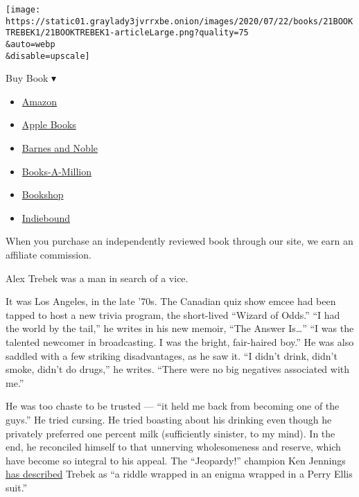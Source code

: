 \texttt{[image: https://static01.graylady3jvrrxbe.onion/images/2020/07/22/books/21BOOKTREBEK1/21BOOKTREBEK1-articleLarge.png?quality=75\\\&auto=webp\\\&disable=upscale]}

Buy Book ▾

\begin{itemize}
\tightlist
\item
  \href{https://www.amazon.com/gp/search?index=books\&tag=NYTBSREV-20\&field-keywords=The+Answer+Is...+Alex+Trebek}{Amazon}
\item
  \href{https://du-gae-books-dot-nyt-du-prd.appspot.com/buy?title=The+Answer+Is...\&author=Alex+Trebek}{Apple
  Books}
\item
  \href{https://www.anrdoezrs.net/click-7990613-11819508?url=https\%3A\%2F\%2Fwww.barnesandnoble.com\%2Fw\%2F\%3Fean\%3D9781982157999}{Barnes
  and Noble}
\item
  \href{https://www.anrdoezrs.net/click-7990613-35140?url=https\%3A\%2F\%2Fwww.booksamillion.com\%2Fp\%2FThe\%2BAnswer\%2BIs...\%2FAlex\%2BTrebek\%2F9781982157999}{Books-A-Million}
\item
  \href{https://bookshop.org/a/3546/9781982157999}{Bookshop}
\item
  \href{https://www.indiebound.org/book/9781982157999?aff=NYT}{Indiebound}
\end{itemize}

When you purchase an independently reviewed book through our site, we
earn an affiliate commission.

Alex Trebek was a man in search of a vice.

It was Los Angeles, in the late '70s. The Canadian quiz show emcee had
been tapped to host a new trivia program, the short-lived ``Wizard of
Odds.'' ``I had the world by the tail,'' he writes in his new memoir,
``The Answer Is\ldots{}'' ``I was the talented newcomer in broadcasting.
I was the bright, fair-haired boy.'' He was also saddled with a few
striking disadvantages, as he saw it. ``I didn't drink, didn't smoke,
didn't do drugs,'' he writes. ``There were no big negatives associated
with me.''

He was too chaste to be trusted --- ``it held me back from becoming one
of the guys.'' He tried cursing. He tried boasting about his drinking
even though he privately preferred one percent milk (sufficiently
sinister, to my mind). In the end, he reconciled himself to that
unnerving wholesomeness and reserve, which have become so integral to
his appeal. The ``Jeopardy!'' champion Ken Jennings
\href{https://www.nytimes3xbfgragh.onion/2019/03/09/opinion/sunday/alex-trebek-jeopardy-ken-jennings.html}{has
described} Trebek as ``a riddle wrapped in an enigma wrapped in a Perry
Ellis suit.''


